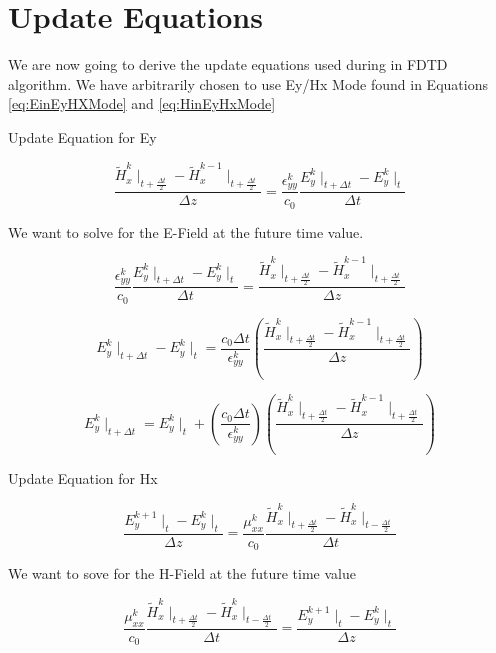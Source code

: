 \documentclass[a4paper,10pt]{article}
\begin{document}
\section{Update Equations}
We are now going to derive the update equations used during in FDTD algorithm.  We have arbitrarily chosen to use Ey/Hx Mode found in Equations \eqref{eq:EinEyHXMode} and \eqref{eq:HinEyHxMode}

Update Equation for Ey

\begin{equation*}
  \frac{\tilde{H}_{x}^{k}\mid_{t+\frac{\Delta t}{2}} - \tilde{H}_{x}^{k-1}\mid_{t+\frac  {\Delta t}{2}}}{\Delta z} = \frac{\epsilon_{yy}^{k}}{c_0} \frac{E_{y}^{k}\mid_{t+\Delta t} - E_{y}^{k}\mid_{t}}{\Delta t}
\end{equation*}

We want to solve for the E-Field at the future time value.

\begin{equation*}
  \frac{\epsilon_{yy}^{k}}{c_0} \frac{E_{y}^{k}\mid_{t+\Delta t} - E_{y}^{k}\mid_{t}}{\Delta t} = \frac{\tilde{H}_{x}^{k}\mid_{t+\frac{\Delta t}{2}} - \tilde{H}_{x}^{k-1}\mid_{t+\frac  {\Delta t}{2}}}{\Delta z}
\end{equation*}

\begin{equation*}
  E_{y}^{k}\mid_{t+\Delta t} - E_{y}^{k}\mid_{t} = \frac{c_0\Delta t}{\epsilon_{yy}^{k}} \left(\frac{\tilde{H}_{x}^{k}\mid_{t+\frac{\Delta t}{2}} - \tilde{H}_{x}^{k-1}\mid_{t+\frac  {\Delta t}{2}}}{\Delta z}\right)
\end{equation*}

\begin{equation}
  E_{y}^{k}\mid_{t+\Delta t} = E_{y}^{k}\mid_{t} + \left(\frac{c_0\Delta t}{\epsilon_{yy}^{k}}\right) \left( \frac{\tilde{H}_{x}^{k}\mid_{t+\frac{\Delta t}{2}} - \tilde{H}_{x}^{k-1}\mid_{t+\frac  {\Delta t}{2}}}{\Delta z}\right)
\end{equation}


Update Equation for Hx

\begin{equation*}
  \frac{E_{y}^{k+1}\mid_{t} - E_{y}^{k}\mid_{t}}{\Delta z} = \frac{\mu_{xx}^{k}}{c_0} \frac{\tilde{H}_{x}^{k}\mid_{t+\frac  {\Delta t}{2}} - \tilde{H}_{x}^{k}\mid_{t-\frac{\Delta t}{2}}}{\Delta t}
\end{equation*}

We want to sove for the H-Field at the future time value

\begin{equation*}
  \frac{\mu_{xx}^{k}}{c_0} \frac{\tilde{H}_{x}^{k}\mid_{t+\frac  {\Delta t}{2}} - \tilde{H}_{x}^{k}\mid_{t-\frac{\Delta t}{2}}}{\Delta t} = \frac{E_{y}^{k+1}\mid_{t} - E_{y}^{k}\mid_{t}}{\Delta z}
\end{equation*}
\end{document}
